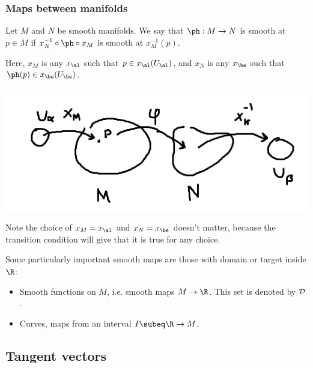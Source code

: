 \subsubsection{Maps between manifolds}
\begin{df}
Let $M$ and $N$ be smooth manifolds.
We say that $\ph:M\to N$ is smooth at $p\in M$ if $x_N^{-1}\circ \ph\circ x_M$ is smooth at $x_M^{-1}(p)$.

Here, $x_M$ is any $x_{\al}$ such that $p\in x_{\al}(U_{\al})$, and $x_N$ is any $x_{\be}$ such that $\ph(p)\in x_{\be}(U_{\be})$.
\end{df}

\begin{center}
\includegraphics{1-2}
\end{center}

Note the choice of $x_M=x_{\al}$ and $x_N=x_{\be}$ doesn't matter, because the transition condition will give that it is true for any choice.

Some particularly important smooth maps are those with domain or target inside $\R$:
\begin{itemize}
\item
Smooth functions on $M$, i.e. smooth maps $M\to \R$. This set is denoted by $\cal D$.
\item
Curves, maps from an interval $I\subeq \R\to M$.
\end{itemize}

\subsection{Tangent vectors}


